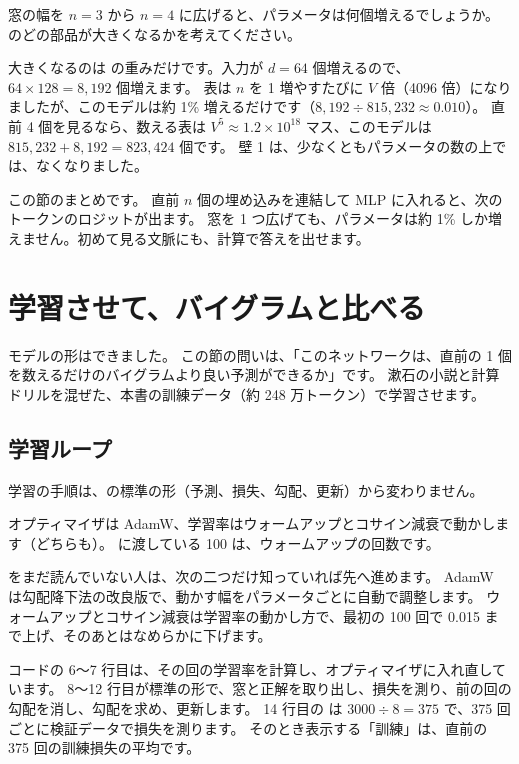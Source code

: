 \begin{quiz}
窓の幅を $n=3$ から $n=4$ に広げると、パラメータは何個増えるでしょうか。
のどの部品が大きくなるかを考えてください。
\end{quiz}

大きくなるのは  の重みだけです。入力が $d=64$ 個増えるので、$64\times128=8{,}192$ 個増えます。
表は $n$ を 1 増やすたびに $V$ 倍（4096 倍）になりましたが、このモデルは約 1\% 増えるだけです（$8{,}192\div815{,}232\approx0.010$）。
直前 4 個を見るなら、数える表は $V^5\approx1.2\times10^{18}$ マス、このモデルは $815{,}232+8{,}192=823{,}424$ 個です。
壁 1 は、少なくともパラメータの数の上では、なくなりました。

この節のまとめです。
直前 $n$ 個の埋め込みを連結して MLP に入れると、次のトークンのロジットが出ます。
窓を 1 つ広げても、パラメータは約 1\% しか増えません。初めて見る文脈にも、計算で答えを出せます。

\section{学習させて、バイグラムと比べる}\label{sec:emb-train}

モデルの形はできました。
この節の問いは、「このネットワークは、直前の 1 個を数えるだけのバイグラムより良い予測ができるか」です。
漱石の小説と計算ドリルを混ぜた、本書の訓練データ（約 248 万トークン）で学習させます。

\subsection*{学習ループ}

学習の手順は、の標準の形（予測、損失、勾配、更新）から変わりません。


オプティマイザは AdamW、学習率はウォームアップとコサイン減衰で動かします（どちらも）。
 に渡している 100 は、ウォームアップの回数です。

をまだ読んでいない人は、次の二つだけ知っていれば先へ進めます。
AdamW は勾配降下法の改良版で、動かす幅をパラメータごとに自動で調整します。
ウォームアップとコサイン減衰は学習率の動かし方で、最初の 100 回で 0.015 まで上げ、そのあとはなめらかに下げます。

コードの 6〜7 行目は、その回の学習率を計算し、オプティマイザに入れ直しています。
8〜12 行目が標準の形で、窓と正解を取り出し、損失を測り、前の回の勾配を消し、勾配を求め、更新します。
14 行目の  は $3000\div8=375$ で、375 回ごとに検証データで損失を測ります。
そのとき表示する「訓練」は、直前の 375 回の訓練損失の平均です。

